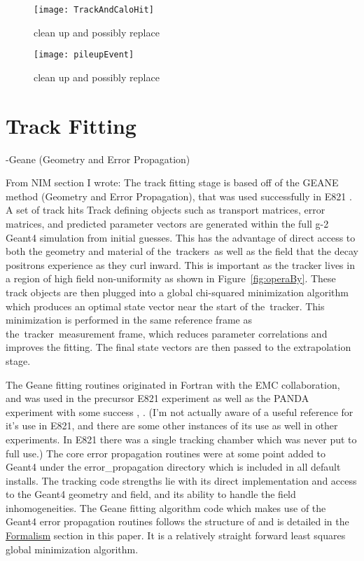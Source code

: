 \cite{trackfinding}





\begin{figure}[]
	\centering
	\texttt{[image: TrackAndCaloHit]}
    \caption[TrackAndCaloHit]{clean up and possibly replace}    
    \label{fig:TrackAndCaloHit}
\end{figure}

\begin{figure}[]
	\centering
	\texttt{[image: pileupEvent]}
    \caption[pileupEvent]{clean up and possibly replace}    
    \label{fig:pileupEvent}
\end{figure}




\section{Track Fitting}
\label{sec:TrackFitting}


-Geane (Geometry and Error Propagation)


From NIM section I wrote:
The track fitting stage is based off of the GEANE method (Geometry and Error Propagation), that was used successfully in E821 \cite{geanemanual}. A set of track hits  Track defining objects such as transport matrices, error matrices, and predicted parameter vectors are generated within the full g-2 Geant4 simulation from initial guesses. This has the advantage of direct access to both the geometry and material of the trackers as well as the field that the decay positrons experience as they curl inward. This is important as the tracker lives in a region of high field non-uniformity as shown in Figure~\ref{fig:operaBy}. These track objects are then plugged into a global chi-squared minimization algorithm which produces an optimal state vector near the start of the tracker. This minimization is performed in the same reference frame as the tracker measurement frame, which reduces parameter correlations and improves the fitting. The final state vectors are then passed to the extrapolation stage.






The Geane fitting routines originated in Fortran with the EMC collaboration, and was used in the precursor E821 experiment as well as the PANDA experiment with some success \cite{geanemanual}, \cite{Lavezzi}. (I'm not actually aware of a useful reference for it's use in E821, and there are some other instances of its use as well in other experiments. In E821 there was a single tracking chamber which was never put to full use.) The core error propagation routines were at some point added to Geant4 under the error\_propagation directory which is included in all default installs. The tracking code strengths lie with its direct implementation and access to the Geant4 geometry and field, and its ability to handle the field inhomogeneities. The Geane fitting algorithm code which makes use of the Geant4 error propagation routines follows the structure of \cite{geanemanual} and is detailed in the \hyperref[sec:Formalism]{Formalism} section in this paper. It is a relatively straight forward least squares global \chisq minimization algorithm. 


